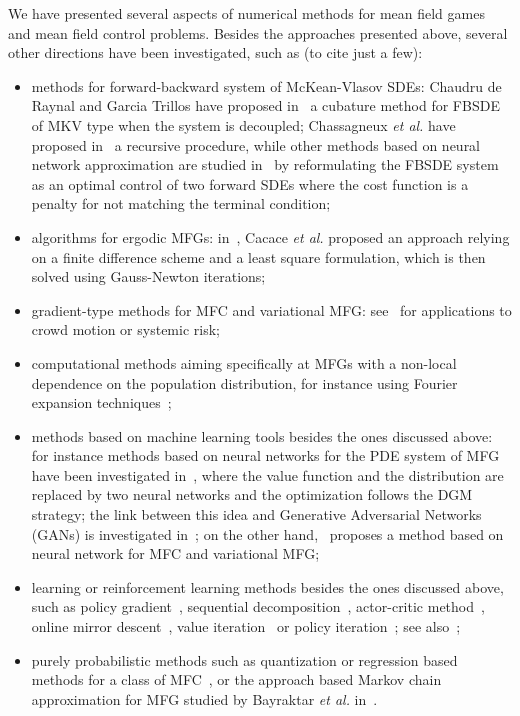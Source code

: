 \documentclass{amsproc}
\theoremstyle{definition}
\theoremstyle{remark}
\numberwithin{equation}{section}
\begin{document}
We have presented several aspects of numerical methods for mean field games and mean field control problems. Besides the approaches presented above, several other directions have been investigated, such as (to cite just a few):
\begin{itemize}
	\item methods for forward-backward system of McKean-Vlasov SDEs: Chaudru de Raynal and Garcia Trillos have proposed in~\cite{MR3322862} a cubature method for FBSDE of MKV type when the system is decoupled; Chassagneux \textit{et al.} have proposed in~\cite{MR3914553,Angiulietal-2019} a recursive procedure, while other methods based on neural network approximation are studied in~\cite{fouque2019deep,carmona2019convergence2,germain2019numerical} by reformulating the FBSDE system as an optimal control of two forward SDEs where the cost function is a penalty for not matching the terminal condition;
	\item algorithms for ergodic MFGs: in~\cite{MR3601001,MR3882530}, Cacace \textit{et al.} proposed an approach relying on a finite difference scheme and a least square formulation, which is then solved using Gauss-Newton iterations; 
	\item gradient-type methods for MFC and variational MFG: see~\cite{LachapelleWolfram-2011-MFG-congestion-aversion, MR3501391,MR3619691} for applications to crowd motion or systemic risk;
	\item computational methods aiming specifically at MFGs with a non-local dependence on the population distribution, for instance using Fourier expansion techniques~\cite{nurbekyan2019fourier};
	\item methods based on machine learning tools besides the ones discussed above: for instance methods based on neural networks for the PDE system of MFG have been investigated in~\cite{al2018solving,carmona2019convergence1}, where the value function and the distribution are replaced by two neural networks and the optimization follows the DGM strategy; the link between this idea and Generative Adversarial Networks (GANs) is investigated in~\cite{cao2020connecting}; on the other hand,~\cite{ruthotto2020machine} proposes a method based on neural network for MFC and variational MFG;
	\item learning or reinforcement learning methods besides the ones discussed above, such as policy gradient~\cite{subramanianpolicy}, sequential decomposition~\cite{mishra2020model}, actor-critic method~\cite{fu2019actor}, online mirror descent~\cite{Hadikhanloo-phdthesis}, value iteration~\cite{anahtarci2019value} or policy iteration~\cite{cacacecamilligoffi2020policy}; see also~\cite{tembine2012meanfieldlearning};
	\item purely probabilistic methods such as quantization or regression based methods for a class of MFC~\cite{balata2019class}, or the approach based Markov chain approximation for MFG studied by Bayraktar \textit{et al.} in~\cite{MR3873029}.
\end{itemize}
\end{document}
